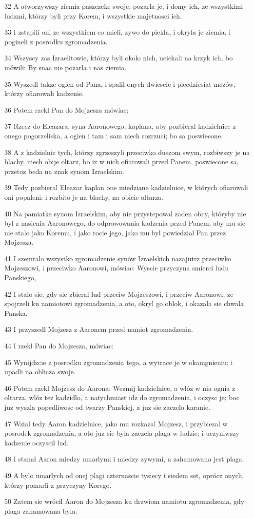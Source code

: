 \par 32 A otworzywszy ziemia paszczeke swoje, pozarla je, i domy ich, ze wszystkimi ludzmi, którzy byli przy Korem, i wszystkie majetnosci ich.
\par 33 I zstapili oni ze wszystkiem co mieli, zywo do piekla, i okryla je ziemia, i pogineli z posrodku zgromadzenia.
\par 34 Wszyscy zas Izraelitowie, którzy byli okolo nich, uciekali na krzyk ich, bo mówili: By snac nie pozarla i nas ziemia.
\par 35 Wyszedl takze ogien od Pana, i spalil onych dwiescie i piecdziesiat mezów, którzy ofiarowali kadzenie.
\par 36 Potem rzekl Pan do Mojzesza mówiac:
\par 37 Rzecz do Eleazara, syna Aaronowego, kaplana, aby pozbieral kadzielnice z onego pogorzeliska, a ogien i tam i sam niech rozrzuci; bo sa poswiecone.
\par 38 A z kadzielnic tych, którzy zgrzeszyli przeciwko duszom swym, rozbiwszy je na blachy, niech obije oltarz, bo iz w nich ofiarowali przed Panem, poswiecone sa, przetoz beda na znak synom Izraelskim.
\par 39 Tedy pozbieral Eleazar kaplan one miedziane kadzielnice, w których ofiarowali oni popaleni; i rozbito je na blachy, na obicie oltarza.
\par 40 Na pamiatke synom Izraelskim, aby nie przystepowal zaden obcy, któryby nie byl z nasienia Aaronowego, do odprawowania kadzenia przed Panem, aby mu sie nie stalo jako Koremu, i jako rocie jego, jako mu byl powiedzial Pan przez Mojzesza.
\par 41 I szemralo wszystko zgromadzenie synów Izraelskich nazajutrz przeciwko Mojzeszowi, i przeciwko Aaronowi, mówiac: Wyscie przyczyna smierci ludu Panskiego,
\par 42 I stalo sie, gdy sie zbieral lud przeciw Mojzeszowi, i przeciw Aaronowi, ze spojrzeli ku namiotowi zgromadzenia, a oto, okryl go oblok, i okazala sie chwala Panska.
\par 43 I przyszedl Mojzesz z Aaronem przed namiot zgromadzenia.
\par 44 I rzekl Pan do Mojzesza, mówiac:
\par 45 Wynijdzcie z posrodku zgromadzenia tego, a wytrace je w okamgnieniu; i upadli na oblicza swoje.
\par 46 Potem rzekl Mojzesz do Aarona: Wezmij kadzielnice, a wlóz w nia ognia z oltarza, wlóz tez kadzidlo, a natychmiast idz do zgromadzenia, i oczysc je; boc juz wyszla popedliwosc od twarzy Panskiej, a juz sie zaczelo karanie.
\par 47 Wzial tedy Aaron kadzielnice, jako mu rozkazal Mojzesz, i przybiezal w posrodek zgromadzenia, a oto juz sie byla zaczela plaga w ludzie; i uczyniwszy kadzenie oczyscil lud.
\par 48 I stanal Aaron miedzy umarlymi i miedzy zywymi, a zahamowana jest plaga.
\par 49 A bylo umarlych od onej plagi czternascie tysiecy i siedem set, oprócz onych, którzy pomarli z przyczyny Korego.
\par 50 Zatem sie wrócil Aaron do Mojzesza ku drzwiom namiotu zgromadzenia, gdy plaga zahamowana byla.

